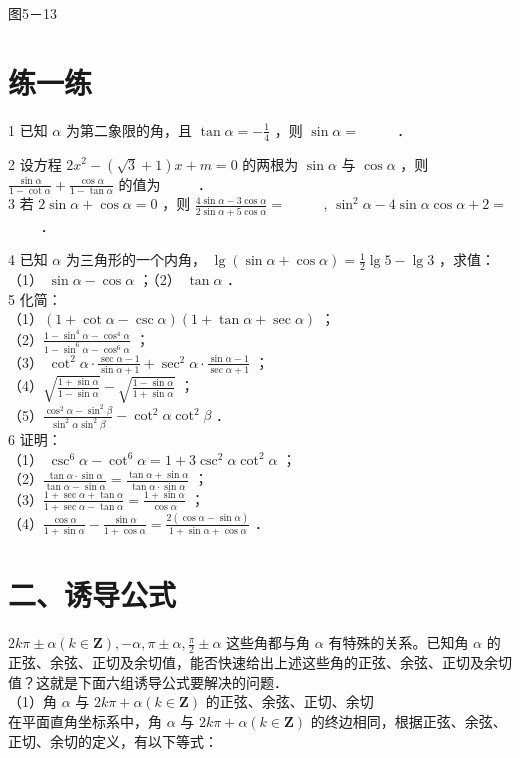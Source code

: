 \documentclass[10pt]{article}
\begin{document}
图5－13

\section*{练一练}
1 已知 \(\alpha\) 为第二象限的角，且 \(\tan \alpha=-\frac{1}{4}\) ，则 \(\sin \alpha=\) \(\qquad\) ．

2 设方程 \(2 x^{2}-(\sqrt{3}+1) x+m=0\) 的两根为 \(\sin \alpha\) 与 \(\cos \alpha\) ，则 \(\frac{\sin \alpha}{1-\cot \alpha}+\frac{\cos \alpha}{1-\tan \alpha}\) 的值为 \(\qquad\) ．\\
3 若 \(2 \sin \alpha+\cos \alpha=0\) ，则 \(\frac{4 \sin \alpha-3 \cos \alpha}{2 \sin \alpha+5 \cos \alpha}=\) \(\qquad\) , \(\sin ^{2} \alpha-4 \sin \alpha \cos \alpha+2=\) \(\qquad\) ．

4 已知 \(\alpha\) 为三角形的一个内角， \(\lg (\sin \alpha+\cos \alpha)=\frac{1}{2} \lg 5-\lg 3\) ，求值：\\
（1） \(\sin \alpha-\cos \alpha\) ；（2） \(\tan \alpha\) ．\\
5 化简：\\
（1）\((1+\cot \alpha-\csc \alpha)(1+\tan \alpha+\sec \alpha)\) ；\\
（2）\(\frac{1-\sin ^{4} \alpha-\cos ^{4} \alpha}{1-\sin ^{6} \alpha-\cos ^{6} \alpha}\) ；\\
（3） \(\cot ^{2} \alpha \cdot \frac{\sec \alpha-1}{\sin \alpha+1}+\sec ^{2} \alpha \cdot \frac{\sin \alpha-1}{\sec \alpha+1}\) ；\\
（4）\(\sqrt{\frac{1+\sin \alpha}{1-\sin \alpha}}-\sqrt{\frac{1-\sin \alpha}{1+\sin \alpha}}\) ；\\
（5）\(\frac{\cos ^{2} \alpha-\sin ^{2} \beta}{\sin ^{2} \alpha \sin ^{2} \beta}-\cot ^{2} \alpha \cot ^{2} \beta\) ．\\
6 证明：\\
（1） \(\csc ^{6} \alpha-\cot ^{6} \alpha=1+3 \csc ^{2} \alpha \cot ^{2} \alpha\) ；\\
（2）\(\frac{\tan \alpha \cdot \sin \alpha}{\tan \alpha-\sin \alpha}=\frac{\tan \alpha+\sin \alpha}{\tan \alpha \cdot \sin \alpha}\) ；\\
（3）\(\frac{1+\sec \alpha+\tan \alpha}{1+\sec \alpha-\tan \alpha}=\frac{1+\sin \alpha}{\cos \alpha}\) ；\\
（4）\(\frac{\cos \alpha}{1+\sin \alpha}-\frac{\sin \alpha}{1+\cos \alpha}=\frac{2(\cos \alpha-\sin \alpha)}{1+\sin \alpha+\cos \alpha}\) ．

\section*{二、诱导公式}
\(2 k \pi \pm \alpha(k \in \mathbf{Z}),-\alpha, \pi \pm \alpha, \frac{\pi}{2} \pm \alpha\) 这些角都与角 \(\alpha\) 有特殊的关系。已知角 \(\alpha\) 的正弦、余弦、正切及余切值，能否快速给出上述这些角的正弦、余弦、正切及余切值？这就是下面六组诱导公式要解决的问题．\\
（1）角 \(\alpha\) 与 \(2 k \pi+\alpha(k \in \mathbf{Z})\) 的正弦、余弦、正切、余切\\
在平面直角坐标系中，角 \(\alpha\) 与 \(2 k \pi+\alpha(k \in \mathbf{Z})\) 的终边相同，根据正弦、余弦、正切、余切的定义，有以下等式：
\end{document}
